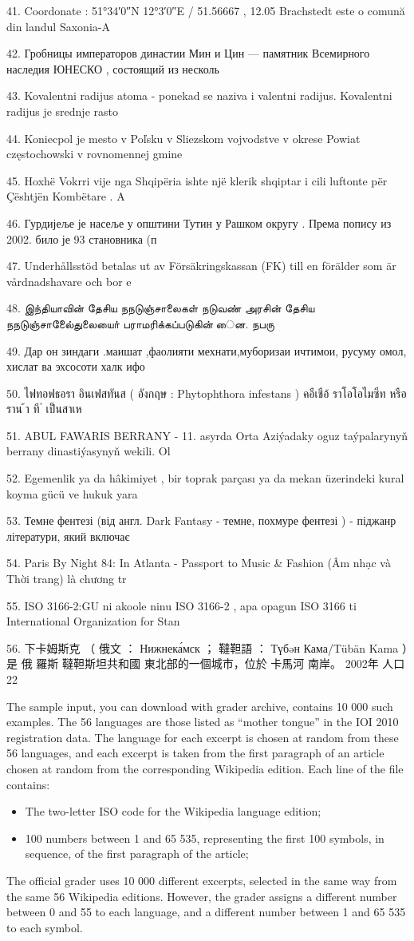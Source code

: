 41. Coordonate : 51°34′0″N 12°3′0″E / 51.56667 , 12.05 Brachstedt este o comună din
landul Saxonia-A

42. Гробницы императоров династии Мин и Цин --- памятник Всемирного наследия
ЮНЕСКО , состоящий из несколь

43. Kovalentni radijus atoma - ponekad se naziva i valentni radijus. Kovalentni radijus je
srednje rasto

44. Koniecpol je mesto v Poľsku v Sliezskom vojvodstve v okrese Powiat częstochowski v
rovnomennej gmine

45. Hoxhë Vokrri vije nga Shqipëria ishte një klerik shqiptar i cili luftonte për Çështjën
Kombëtare . A

46. Гурдијеље је насеље у општини Тутин у Рашком округу . Према попису из 2002.
било је 93 становника (п

47. Underhållsstöd betalas ut av Försäkringskassan (FK) till en förälder som är
vårdnadshavare och bor e

48. இந்தியாவின் தேசிய நநடுஞ்சாலைகள் நடுவண் அரசின் தேசிய
நநடுஞ்சாலைே்துலையாை் பராமரிக்கப்படுகின் ைன. நபரு

49. Дар он зиндаги .маишат ,фаолияти мехнати,муборизаи ичтимои, русуму омол,
хислат ва эхсосоти халк ифо

50. ไฟทอฟธอรา อินเฟสทันส ( อังกฤษ : Phytophthora infestans ) คอืเชือ้ ราโอโอไมซีท หรือ ราน
้า
ที
่
เป็นสาเห

51. ABUL FAWARIS BERRANY - 11. asyrda Orta Aziýadaky oguz taýpalarynyň berrany
dinastiýasynyň wekili. Ol

52. Egemenlik ya da hâkimiyet , bir toprak parçası ya da mekan üzerindeki kural koyma
gücü ve hukuk yara

53. Темне фентезі (від англ. Dark Fantasy - темне, похмуре фентезі ) - піджанр
літератури, який включає

54. Paris By Night 84: In Atlanta - Passport to Music & Fashion (Âm nhạc và Thời trang) là
chương tr

55. ISO 3166-2:GU ni akoole ninu ISO 3166-2 , apa opagun ISO 3166 ti International
Organization for Stan

56. 下卡姆斯克 （ 俄文 ： Нижнека́мск ； 韃靼語 ： Түбəн Кама/Tübän Kama ）是 俄
羅斯 韃靼斯坦共和國 東北部的一個城市，位於 卡馬河 南岸。 2002年 人口22

The sample input, you can download with grader archive, contains 10 000 such examples. The 56 languages are those listed as ``mother tongue'' in the IOI 2010 registration data. The language for each excerpt is chosen at random from these 56 languages, and each excerpt is taken from the first paragraph of an article chosen at random from the corresponding Wikipedia edition. Each line of the file contains:
\begin{itemize}
\item The two-letter ISO code for the Wikipedia language edition;
\item 100 numbers between 1 and 65 535, representing the first 100 symbols, in
sequence, of the first paragraph of the article;
\end{itemize}

The official grader uses 10 000 different excerpts, selected in the same way from the
same 56 Wikipedia editions. However, the grader assigns a different number between
0 and 55 to each language, and a different number between 1 and 65 535 to each
symbol.